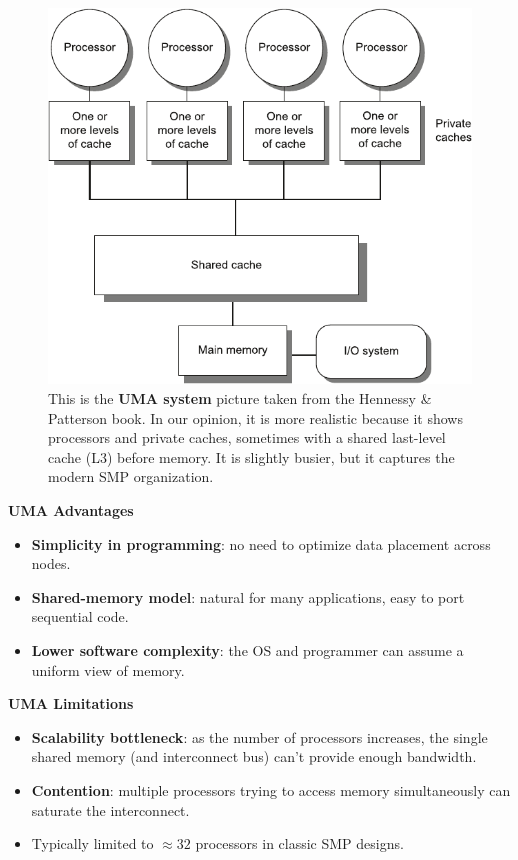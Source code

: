 \begin{itemize}
    \newpage

    \begin{figure}[!htp]
        \centering
        \includegraphics[width=.9\textwidth]{img/uma.pdf}
        \caption{This is the \textbf{UMA system} picture taken from the Hennessy \& Patterson book.\cite{hennessy2017computer} In our opinion, it is more realistic because it shows processors and private caches, sometimes with a shared last-level cache (L3) before memory. It is slightly busier, but it captures the modern SMP organization.}
    \end{figure}
    
    \textcolor{Green3}{ \textbf{UMA Advantages}}
    \begin{itemize}
        \item[\textcolor{Green3}{\faIcon{check}}] \textcolor{Green3}{\textbf{Simplicity in programming}}: no need to optimize data placement across nodes.
        \item[\textcolor{Green3}{\faIcon{check}}] \textcolor{Green3}{\textbf{Shared-memory model}}: natural for many applications, easy to port sequential code.
        \item[\textcolor{Green3}{\faIcon{check}}] \textcolor{Green3}{\textbf{Lower software complexity}}: the OS and programmer can assume a uniform view of memory.
    \end{itemize}
    \textcolor{Red2}{ \textbf{UMA Limitations}}
    \begin{itemize}
        \item[\textcolor{Red2}{\faIcon{times}}] \textcolor{Red2}{\textbf{Scalability bottleneck}}: as the number of processors increases, the single shared memory (and interconnect bus) can't provide enough bandwidth.
        \item[\textcolor{Red2}{\faIcon{times}}] \textcolor{Red2}{\textbf{Contention}}: multiple processors trying to access memory simultaneously can saturate the interconnect.
        \item[\textcolor{Red2}{\faIcon{times}}] Typically limited to $\approx 32$ processors in classic SMP designs.
    \end{itemize}



\end{itemize}
